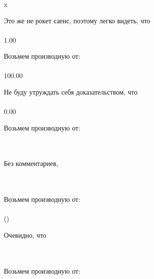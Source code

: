 \begin{}
x \\
\end{}
Это же не рокет саенс, поэтому легко видеть, что
\begin{gather}
\end{gather}
\begin{}
1.00 \\
\end{}
Возьмем производную от:
\begin{gather}
\end{gather}
\begin{}
100.00 \\
\end{}
Не буду утруждать себя доказательством, что
\begin{gather}
\end{gather}
\begin{}
0.00 \\
\end{}
Возьмем производную от:
\begin{gather}
\end{gather}
\begin{}
\\
\end{}
Без комментариев, 
\begin{gather}
\end{gather}
\begin{}
\\
\end{}
Возьмем производную от:
\begin{gather}
\end{gather}
\begin{}
\arctan ()\\
\end{}
Очевидно, что
\begin{gather}
\end{gather}
\begin{}
\\
\end{}
Возьмем производную от:
\begin{gather}
\end{gather}
\begin{}
\\
\end{}
